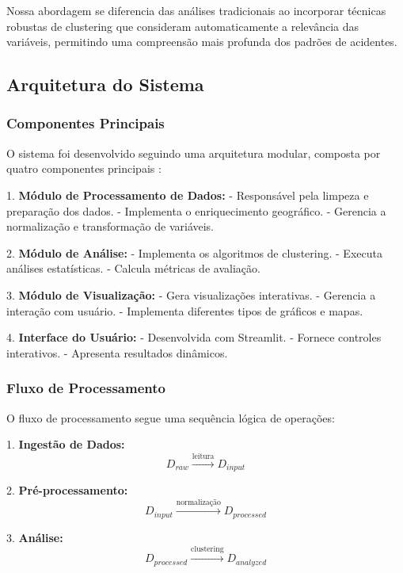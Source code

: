 \documentclass[conference]{IEEEtran}
\begin{document}
Nossa abordagem se diferencia das análises tradicionais ao incorporar técnicas robustas de clustering que consideram automaticamente a relevância das variáveis, permitindo uma compreensão mais profunda dos padrões de acidentes. 

\subsection{Arquitetura do Sistema}

\subsubsection{Componentes Principais}
O sistema foi desenvolvido seguindo uma arquitetura modular, composta por quatro componentes principais :

1. \textbf{Módulo de Processamento de Dados:}
   - Responsável pela limpeza e preparação dos dados.
   - Implementa o enriquecimento geográfico.
   - Gerencia a normalização e transformação de variáveis.

2. \textbf{Módulo de Análise:}
   - Implementa os algoritmos de clustering.
   - Executa análises estatísticas.
   - Calcula métricas de avaliação.

3. \textbf{Módulo de Visualização:}
   - Gera visualizações interativas.
   - Gerencia a interação com usuário.
   - Implementa diferentes tipos de gráficos e mapas.

4. \textbf{Interface do Usuário:}
   - Desenvolvida com Streamlit.
   - Fornece controles interativos.
   - Apresenta resultados dinâmicos.

\subsubsection{Fluxo de Processamento}
O fluxo de processamento segue uma sequência lógica de operações:

1. \textbf{Ingestão de Dados:}
\begin{equation}
D_{raw} \xrightarrow{\text{leitura}} D_{input}
\end{equation}

2. \textbf{Pré-processamento:}
\begin{equation}
D_{input} \xrightarrow{\text{normalização}} D_{processed}
\end{equation}

3. \textbf{Análise:}
\begin{equation}
D_{processed} \xrightarrow{\text{clustering}} D_{analyzed}
\end{equation}
\end{document}
